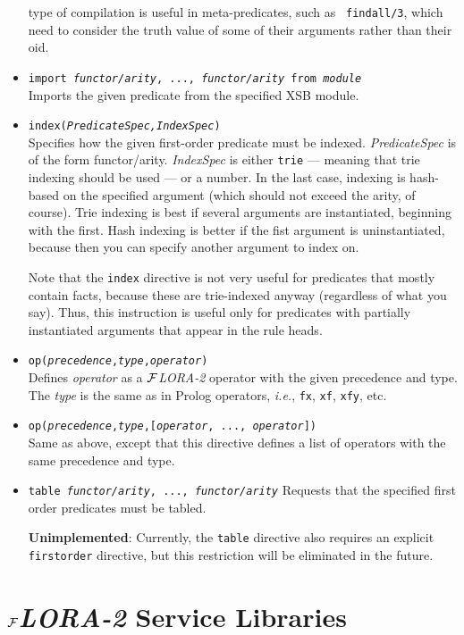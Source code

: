 \documentclass[11pt]{article}
\newcommand{\FLORA}{{\mbox{${\cal F}${\small\it LORA}\rm\emph{-2}}}\xspace}
\begin{document}
\begin{itemize}
  type of compilation is useful in meta-predicates, such as {\tt
    findall/3}, which need to consider the truth value of some of their
  arguments rather than their oid.
\item {\tt import {\it functor/arity}, ..., {\it functor/arity} from
    {\it module}}
  \\
  Imports the given predicate from the specified XSB module.
\item {\tt index({\it PredicateSpec,IndexSpec})}
  \\
  Specifies how the given first-order predicate must be indexed.
  {\em PredicateSpec} is of the form functor/arity. \emph{IndexSpec} is
  either {\tt trie} --- meaning that trie indexing should be used --- or a
  number. In the last case, indexing is hash-based on the specified
  argument (which should not exceed the arity, of course).
  Trie indexing is best if several arguments are instantiated, beginning
  with the first. Hash indexing is better if the fist argument is
  uninstantiated, because then you can specify another argument to index
  on.
  
  Note that the {\tt index} directive is not very useful for predicates
  that mostly contain facts, because these are trie-indexed anyway
  (regardless of what you say). Thus, this instruction is useful only for
  predicates with partially instantiated arguments that appear in the rule
  heads.
\item {\tt op({\it precedence},{\it type},{\it operator})}
  \\
  Defines \emph{operator} as a \FLORA operator with the given precedence
  and type. The \emph{type} is the same as in Prolog operators, {\it i.e.},
  {\tt fx}, {\tt xf}, {\tt xfy}, etc.
\item {\tt op({\it precedence},{\it type},[{\it operator}, ..., {\it operator}])}
  \\
  Same as above, except that this directive defines a list of operators
  with the same precedence and type.
\item {\tt table {\it functor/arity}, ..., {\it functor/arity}}
  Requests that the specified first order predicates must be tabled.
  
  {\bf Unimplemented}: Currently, the {\tt table} directive also requires
  an explicit {\tt firstorder} directive, but this restriction will be
  eliminated in the future.
\end{itemize}


\section{\FLORA Service Libraries}\label{sec-service-libs}
\end{document}
